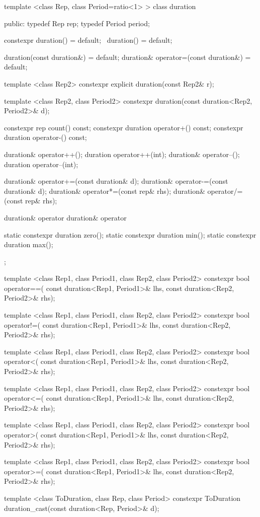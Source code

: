 \begin{cpp}
template <class Rep, class Period=ratio<1> >
class duration
{
public:
  typedef Rep rep;
  typedef Period period;

  constexpr duration() = default;
  ~duration() = default;

  duration(const duration&) = default;
  duration& operator=(const duration&) = default;

  template <class Rep2>
  constexpr explicit duration(const Rep2& r);

  template <class Rep2, class Period2>
  constexpr duration(const duration<Rep2, Period2>& d);

  constexpr rep count() const;
  constexpr duration operator+() const;
  constexpr duration operator-() const;

  duration& operator++();
  duration operator++(int);
  duration& operator--();
  duration operator--(int);

  duration& operator+=(const duration& d);
  duration& operator-=(const duration& d);
  duration& operator*=(const rep& rhs);
  duration& operator/=(const rep& rhs);

  duration& operator%
  duration& operator%

  static constexpr duration zero();
  static constexpr duration min();
  static constexpr duration max();
};

template <class Rep1, class Period1, class Rep2, class Period2>
constexpr bool operator==(
    const duration<Rep1, Period1>& lhs,
    const duration<Rep2, Period2>& rhs);

template <class Rep1, class Period1, class Rep2, class Period2>
    constexpr bool operator!=(
    const duration<Rep1, Period1>& lhs,
    const duration<Rep2, Period2>& rhs);

template <class Rep1, class Period1, class Rep2, class Period2>
    constexpr bool operator<(
    const duration<Rep1, Period1>& lhs,
    const duration<Rep2, Period2>& rhs);

template <class Rep1, class Period1, class Rep2, class Period2>
    constexpr bool operator<=(
    const duration<Rep1, Period1>& lhs,
    const duration<Rep2, Period2>& rhs);

template <class Rep1, class Period1, class Rep2, class Period2>
    constexpr bool operator>(
    const duration<Rep1, Period1>& lhs,
    const duration<Rep2, Period2>& rhs);

template <class Rep1, class Period1, class Rep2, class Period2>
    constexpr bool operator>=(
    const duration<Rep1, Period1>& lhs,
    const duration<Rep2, Period2>& rhs);

template <class ToDuration, class Rep, class Period>
    constexpr ToDuration duration_cast(const duration<Rep, Period>& d);
\end{cpp}

